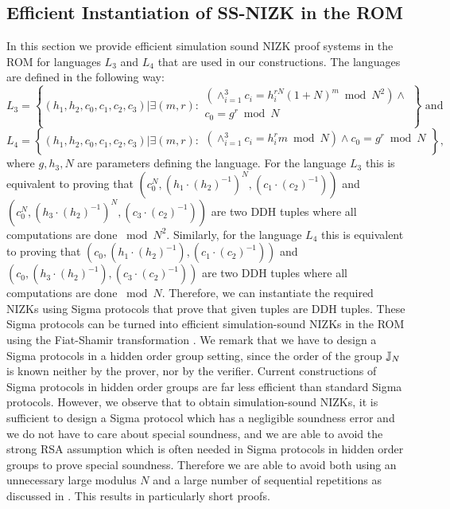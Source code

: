 \subsection{Efficient Instantiation of SS-NIZK in the ROM}\label{sec:nizk} 
In this section we provide efficient simulation sound NIZK proof systems in the ROM for languages $L_3$ and $L_4$ that are used in our constructions. The languages are defined in the following way:
\[
L_3 = \left\{(h_1, h_2, c_0, c_1, c_2, c_3)| \exists (m,r):
\begin{aligned}
       (\land_{i=1}^3 c_i = h_i^{rN}(1+N)^m \bmod N^2) \land \\
       c_0 = g^r \bmod N\\
    \end{aligned}
    \right\} \text{ and }
\]
\[
L_4 = \left\{(h_1, h_2, c_0, c_1, c_2, c_3)| \exists (m,r):
\begin{aligned}
       (\land_{i=1}^3 c_i = h_i^{r}m \bmod N) \land
       c_0 = g^r \bmod N\\
    \end{aligned}
    \right\}, 
\]
where $g, h_3, N$ are parameters defining the language. For the language $L_3$ this is equivalent to proving that $(c_0^N, (h_1\cdot (h_2)^{-1})^N , (c_1\cdot (c_2)^{-1}))$ and $(c_0^N, (h_3\cdot (h_2)^{-1})^N, (c_3\cdot (c_2)^{-1}))$ are two DDH tuples where all computations are done $\bmod N^2$. Similarly, for the language $L_4$ this is equivalent to proving that $(c_0, (h_1\cdot (h_2)^{-1}), (c_1\cdot (c_2)^{-1}))$ and $(c_0, (h_3\cdot (h_2)^{-1}), (c_3\cdot (c_2)^{-1}))$ are two DDH tuples where all computations are done $\bmod N$. Therefore, we can instantiate the required NIZKs using Sigma protocols that prove that given tuples are DDH tuples. These Sigma protocols can be turned into efficient simulation-sound NIZKs in the ROM using the Fiat-Shamir transformation \cite{C:FiaSha86}. We remark that we have to design a Sigma protocols in a hidden order group setting, since the order of the group $\mathbb{J}_N$ is known neither by the prover, nor by the verifier. Current constructions of Sigma protocols in hidden order groups are far less efficient than standard Sigma protocols. However, we observe that to obtain simulation-sound NIZKs, it is sufficient to design a Sigma protocol which has a negligible soundness error and we do not have to care about special soundness, and we are able to avoid the strong RSA assumption which is often needed in Sigma protocols in hidden order groups to prove special soundness. Therefore we are able to avoid both using an unnecessary large modulus $N$ and a large number of sequential repetitions as discussed in \cite{SPEED:BKSST}. 
This results in particularly short proofs. 

